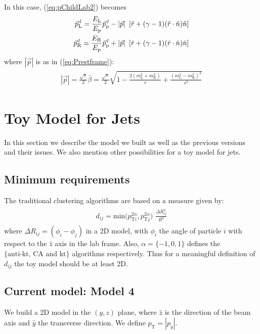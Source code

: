 \documentclass[12pt]{article}
\newcommand{\bea}{\begin{eqnarray}\begin{aligned}}
\newcommand{\eea}{\end{aligned}\end{eqnarray}}
\begin{document}
In this case, (\ref{eq:pChildLab2}) becomes
\bea\label{eq:pChildLab2Gen}
\vec{p}^{\,\it{l}}_{\text{L}}= \frac{E_{\text{L}}}{E_\text{p}} \vec{p}^{\,\it{l}}_\text{p} - |\vec{p}| \,\,\,[ \hat{r} + (\gamma -1) (\hat{r} \cdot \hat{n}) \hat{n} ]  \\
\vec{p}^{\,\it{l}}_{\text{R}}=  \frac{E_{\text{R}}}{E_\text{p}} \vec{p}^{\,\it{l}}_\text{p} +  |\vec{p}| \,\,\,[ \hat{r} + (\gamma -1) (\hat{r} \cdot \hat{n}) \hat{n} ] 
\eea
where $|\vec{p}|$ is as in (\ref{eq:Prestframe}):
\bea
|\vec{p}| =\frac{\sqrt{s}}{2} \bar{\beta}=\frac{\sqrt{s}}{2} \sqrt{1-\frac{2 (m_{\text{L}}^2+m_{\text{R}}^2)}{s}+\frac{(m_{\text{L}}^2-m_{\text{R}}^2)^2}{s^2}}\nonumber
\eea

\vspace{0.6cm}
\section{Toy Model for Jets}

In this section we describe the model we built as well as the previous versions and their issues. We also mention other possibilities for a toy model for jets.


\subsection{Minimum requirements}

The traditional clustering algorithms are based on a measure given by:
\bea\label{eq:dij}
d_{ij}= \text{min}({p_{\text{T}i}^{2\alpha}, {p_{\text{T}j}^{2\alpha}})\,\, \frac{\Delta R_{ij}^2}{R^2}}
\eea
where $\Delta R_{ij}=(\phi_i-\phi_j)$ in a 2D model, with $\phi_i$ the angle of particle $i$ with respect to the $\hat{z}$ axis in the lab frame. Also, $\alpha=\{-1,0,1\}$ defines the $\{\text{anti-kt, CA and kt}\}$ algorithms respectively. Thus for a meaningful definition of $d_{ij}$ the toy model should be at least 2D. 


\subsection{Current model: Model 4 }

We build a 2D model in the $(y,z)$ plane, where $\hat{z}$ is the direction of the beam axis and $\hat{y}$ the transverse direction. 
We define $p_{\text{T}} =|p_y|$.
\end{document}
